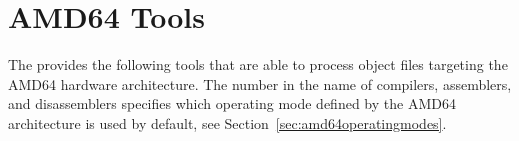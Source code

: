\section{AMD64 Tools}

The \ecs{} provides the following tools that are able to process object files targeting the AMD64 hardware architecture.
The number in the name of compilers, assemblers, and disassemblers specifies which operating mode defined by the AMD64 architecture is used by default, see Section~\ref{sec:amd64operatingmodes}.
\interface\seeguide

\cdamda
\cdamdb
\cdamdc
\cppamda
\cppamdb
\cppamdc
\falamda
\falamdb
\falamdc
\obamda
\obamdb
\obamdc
\amdaasm
\amdbasm
\amdcasm
\amdadism
\amdbdism
\amdcdism
\linkbin

\concludechapter
